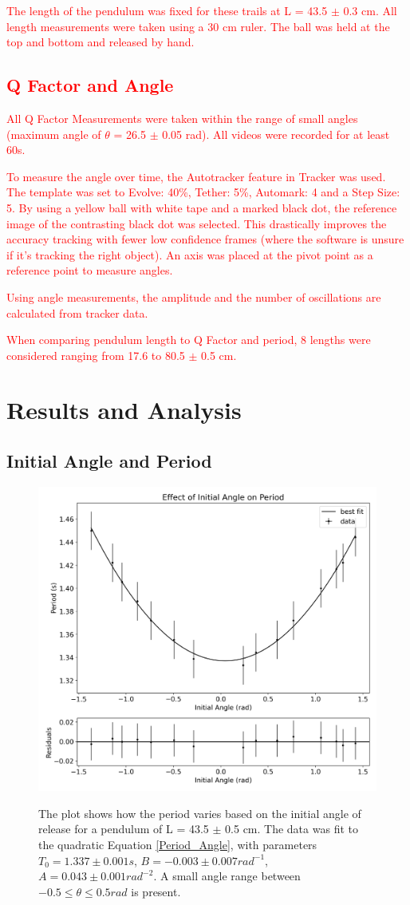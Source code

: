 \documentclass[12pt,twocolumn]{article}
\begin{document}
\textcolor{red}{The length of the pendulum was fixed for
these trails at L = 43.5 $\pm$ 0.3 cm. All length
measurements were taken using a 30 cm ruler.
The ball was held at the top and bottom and
released by hand.}

\subsection{\textcolor{red}{Q Factor and Angle}}
\textcolor{red}{All Q Factor Measurements were taken
within the range of small angles (maximum
angle of $\theta$ = 26.5 $\pm$ 0.05 rad). All videos were
recorded for at least 60s.}

\textcolor{red}{To measure the angle over time, the Autotracker feature in Tracker was used. The
template was set to Evolve: 40\%, Tether: 5\%,
Automark: 4 and a Step Size: 5. By using
a yellow ball with white tape and a marked
black dot, the reference image of the contrasting black dot was selected. 
This drastically improves the accuracy tracking with
fewer low confidence frames (where the software is unsure if it's tracking the right object). An axis was placed at the pivot point
as a reference point to measure angles.}

\textcolor{red}{Using angle measurements, the amplitude
and the number of oscillations are calculated
from tracker data.}

\textcolor{red}{When comparing pendulum length to Q Factor and period, 8 lengths were considered
ranging from 17.6 to 80.5 $\pm$ 0.5 cm.}

\section{Results and Analysis}
\subsection*{Initial Angle and Period}
\begin{figure}[!h]
    \begin{centering}
    \includegraphics[width=0.5 \textwidth]{images/Effect of Initial Angle on Period.png}
    \label{fig:PeriodAngle}
    \caption{The plot shows how the period
    varies based on the initial angle of release
    for a pendulum of L = 43.5 $\pm$ 0.5 cm. The
    data was fit to the quadratic Equation \ref{Period_Angle}, with parameters 
    $T_0 = 1.337 \pm 0.001 s$,
    $B = -0.003 \pm 0.007 rad^{-1}$,
    $A = 0.043 \pm 0.001 rad^{-2}$.
    A small angle range between $-0.5 \leq \theta
    \leq 0.5 rad$ is present.
    }
    \end{centering}
    \end{figure}
\end{document}
